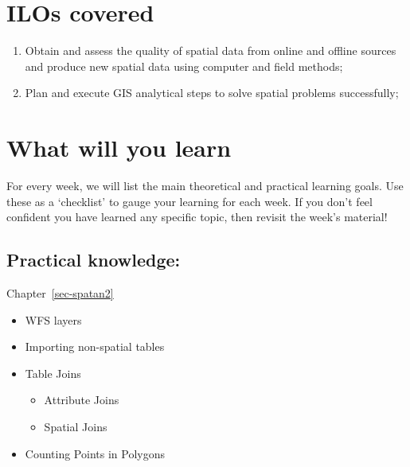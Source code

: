 \documentclass[
  letterpaper,
  DIV=11,
  numbers=noendperiod]{scrreprt}
\providecommand{\tightlist}{%
  \setlength{\itemsep}{0pt}\setlength{\parskip}{0pt}}\usepackage{longtable,booktabs,array}
\begin{document}
\section*{ILOs covered}\label{ilos-covered-5}


\begin{enumerate}
\def\labelenumi{\arabic{enumi}.}
\setcounter{enumi}{1}
\item
  Obtain and assess the quality of spatial data from online and offline
  sources and produce new spatial data using computer and field methods;
\item
  Plan and execute GIS analytical steps to solve spatial problems
  successfully;
\end{enumerate}

\section*{What will you learn}\label{what-will-you-learn-5}


For every week, we will list the main theoretical and practical learning
goals. Use these as a `checklist' to gauge your learning for each week.
If you don't feel confident you have learned any specific topic, then
revisit the week's material!

\subsection*{Practical knowledge:}\label{practical-knowledge-5}

Chapter~\ref{sec-spatan2}

\begin{itemize}
\tightlist
\item
  WFS layers
\item
  Importing non-spatial tables
\item
  Table Joins

  \begin{itemize}
  \tightlist
  \item
    Attribute Joins
  \item
    Spatial Joins
  \end{itemize}
\item
  Counting Points in Polygons
\end{itemize}
\end{document}
